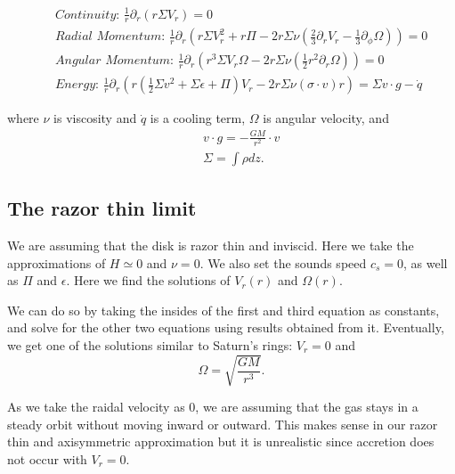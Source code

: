 \documentclass{article}
\begin{document}
\begin{eqnarray}
    && \textit{Continuity: } \frac{1}{r} \partial_r (r \Sigma V_r) = 0 \nonumber \\
    && \textit{Radial Momentum: } \frac{1}{r} \partial_r \left(r \Sigma 
    V_r^2 + r \Pi - 2r \Sigma \nu \left(\frac{2}{3} \partial_r V_r - 
    \frac{1}{3} \partial_\phi \Omega\right)\right) = 0 \nonumber \\
    && \textit{Angular Momentum: } \frac{1}{r} \partial_r \left(r^3 
    \Sigma V_r \Omega - 2 r \Sigma \nu \left(\frac{1}{2} r^2 \partial_r \Omega\right)\right)
    = 0 \nonumber \\
    && \textit{Energy: } \frac{1}{r} \partial_r \left(r \left(\frac{1}{2} \Sigma v^2
    + \Sigma \epsilon + \Pi\right) V_r - 2r\Sigma \nu(\sigma \cdot v ) r\right)
    = \Sigma v\cdot g - \dot q
\end{eqnarray}

where $\nu$ is viscosity and $\dot q$ is a cooling term, $\Omega $ is angular velocity, 
and
\begin{eqnarray}
    && v \cdot g = -\frac{GM}{r^2} \cdot v \nonumber \\
    && \Sigma = \int \rho dz.
\end{eqnarray} 

\subsection{The razor thin limit}
We are assuming that the disk is razor thin and inviscid. Here we take the approximations of
$H \simeq 0$ and $\nu = 0$. We also set the sounds speed $c_s = 0$, as well as $\Pi$ and $\epsilon$.
Here we find the solutions of  $V_r (r)$ and $\Omega (r)$.

We can do so by taking the insides of the first and third equation as constants, and solve for the other two
equations using results obtained from it. Eventually, we get one of the solutions similar to Saturn's rings: 
$V_r = 0$ and 
\begin{equation}
    \Omega = \sqrt{\frac{GM}{r^3}}.
\end{equation}

As we take the raidal velocity as $0$, we are assuming that the gas stays in a steady orbit without moving inward or
outward. This makes sense in our razor thin and axisymmetric approximation but it is unrealistic since accretion does not
occur with $V_r = 0$.
\end{document}
